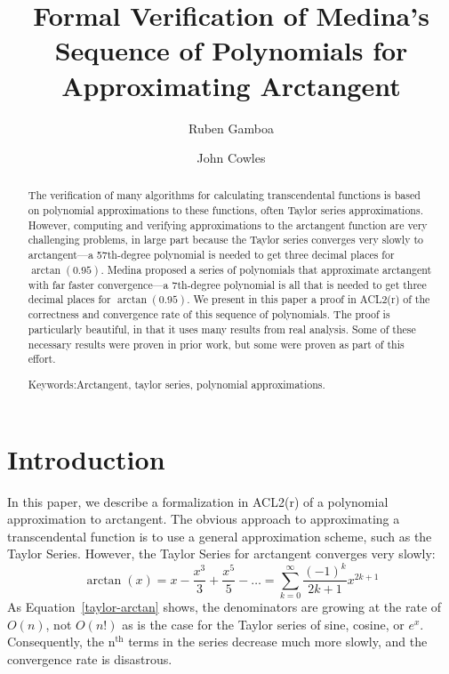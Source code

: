 \documentclass[copyright,creativecommons]{eptcs}
\newcommand{\keywordname}{Keywords:}
\newcommand{\keywords}[1]{\par\addvspace\baselineskip\noindent\keywordname\enspace\ignorespaces#1}
\begin{document}
\title{Formal Verification of Medina's Sequence of Polynomials for Approximating Arctangent}
\def\titlerunning{Polynomial Approximations to Arctangent in ACL2}
\def\authorrunning{Ruben Gamboa \& John Cowles}

\author{Ruben Gamboa 
\and
John Cowles
}

\maketitle

\begin{abstract}
The verification of many algorithms for calculating transcendental functions is based on polynomial approximations to these functions, often Taylor series approximations. However, computing and verifying approximations to the arctangent function are very challenging problems, in large part because the Taylor series converges very slowly to arctangent---a 57th-degree polynomial is needed to get three decimal places for $\arctan(0.95)$. Medina proposed a series of polynomials that approximate arctangent with far faster convergence---a 7th-degree polynomial is all that is needed to get three decimal places for $\arctan(0.95)$. We present in this paper a proof in ACL2(r) of the correctness and convergence rate of this sequence of polynomials. The proof is particularly beautiful, in that it uses many results from real analysis. Some of these necessary results were proven in prior work, but some were proven as part of this effort.

\keywords{Arctangent, taylor series, polynomial approximations.}
\end{abstract}

\section{Introduction}
\label{intro}

In this paper, we describe a formalization in ACL2(r) of a polynomial
approximation to arctangent. The obvious approach to approximating a
transcendental function is to use a general approximation scheme, such
as the Taylor Series. However, the Taylor Series for arctangent converges
very slowly:
\begin{equation}
\label{taylor-arctan}
\arctan(x) = x - \frac{x^3}{3} + \frac{x^5}{5} - \dots =
\sum_{k=0}^{\infty}{\frac{(-1)^k}{2k+1}x^{2k+1}}
\end{equation}
As Equation~\ref{taylor-arctan} shows, the denominators are growing at
the rate of $O(n)$, not $O(n!)$ as is the case for the Taylor series
of sine, cosine, or $e^x$. Consequently, the n$^\text{th}$ terms in
the series decrease much more slowly, and the convergence rate is
disastrous.
\end{document}
